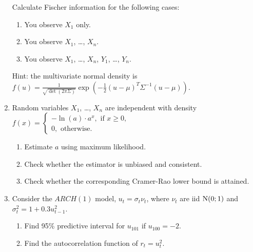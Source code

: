 \begin{enumerate}
Calculate Fischer information for the following cases: 
\begin{enumerate}
	\item You observe $X_1$ only. 
	\item You observe $X_1$, \ldots, $X_n$.
	\item You observe $X_1$, \ldots, $X_n$, $Y_1$, \ldots, $Y_n$.
\end{enumerate}

Hint: the multivariate normal density is 
$
f(u) = \frac{1}{\sqrt{\det(2\pi \Sigma)}} \exp( -\frac{1}{2}(u-\mu)^T \Sigma^{-1}(u-\mu)).
$

\item Random variables $X_1$, \ldots, $X_n$ are independent with density 
$
f(x) = \begin{cases}
	-\ln(a) \cdot a^x, \text{ if } x\geq 0, \\
	0, \text{ otherwise.}
\end{cases}	
$
\begin{enumerate}
	\item Estimate $a$ using maximum likelihood. 
	\item Check whether the estimator is unbiased and consistent. 
	\item Check whether the corresponding Cramer-Rao lower bound is attained. 
\end{enumerate}

\item Consider the $ARCH(1)$ model, $u_t = \sigma_t \nu_t$, where $\nu_t$ are iid $\mathrm{N}(0;1)$ and 
$\sigma^2_t = 1 + 0.3 u_{t-1}^2$. 
\begin{enumerate}
	\item Find 95\% predictive interval for $u_{101}$ if $u_{100} = -2$.
	\item Find the autocorrelation function of $r_t = u_t^2$. 
\end{enumerate}

	


\end{enumerate}

